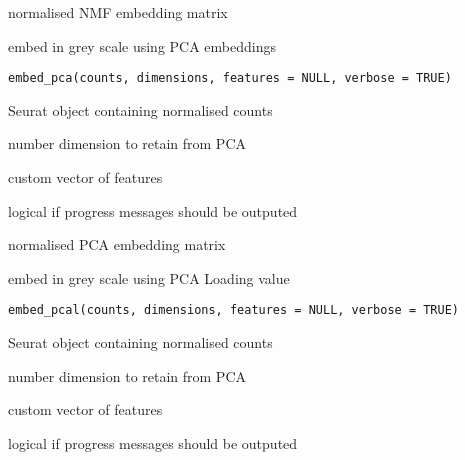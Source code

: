 \documentclass[a4paper]{book}
\begin{document}
%
\begin{Value}
normalised NMF embedding matrix
\end{Value}
%
\begin{Description}
embed in grey scale using PCA embeddings
\end{Description}
%
\begin{Usage}
\begin{verbatim}
embed_pca(counts, dimensions, features = NULL, verbose = TRUE)
\end{verbatim}
\end{Usage}
%
\begin{Arguments}
\begin{ldescription}
\item[\code{counts}] Seurat object containing normalised counts

\item[\code{dimensions}] number dimension to retain from PCA

\item[\code{features}] custom vector of features

\item[\code{verbose}] logical if progress messages should be outputed
\end{ldescription}
\end{Arguments}
%
\begin{Value}
normalised PCA embedding matrix
\end{Value}
%
\begin{Description}
embed in grey scale using PCA Loading value
\end{Description}
%
\begin{Usage}
\begin{verbatim}
embed_pcal(counts, dimensions, features = NULL, verbose = TRUE)
\end{verbatim}
\end{Usage}
%
\begin{Arguments}
\begin{ldescription}
\item[\code{counts}] Seurat object containing normalised counts

\item[\code{dimensions}] number dimension to retain from PCA

\item[\code{features}] custom vector of features

\item[\code{verbose}] logical if progress messages should be outputed
\end{ldescription}
\end{Arguments}
\end{document}
